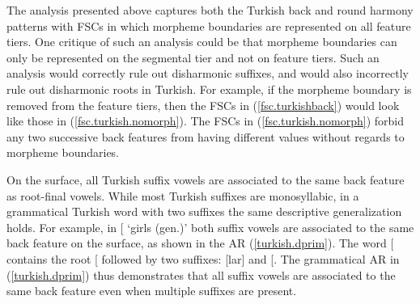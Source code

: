 \documentclass[,doc,floatsintext]{apa6}
\theoremstyle{definition}
\theoremstyle{definition}
\theoremstyle{definition}
\theoremstyle{remark}
\begin{document}
The analysis presented above captures both the Turkish back and round
harmony patterns with FSCs in which morpheme boundaries are represented
on all feature tiers. One critique of such an analysis could be that
morpheme boundaries can only be represented on the segmental tier and
not on feature tiers. Such an analysis would correctly rule out
disharmonic suffixes, and would also incorrectly rule out disharmonic
roots in Turkish. For example, if the morpheme boundary is removed from
the feature tiers, then the FSCs in (\ref{fsc.turkishback}) would look
like those in (\ref{fsc.turkish.nomorph}). The FSCs in
(\ref{fsc.turkish.nomorph}) forbid any two successive back features from
having different values without regards to morpheme boundaries.

\begin{exe}
\ex \label{fsc.turkish.nomorph}
\end{exe}

On the surface, all Turkish suffix vowels are associated to the same
back feature as root-final vowels. While most Turkish suffixes are
monosyllabic, in a grammatical Turkish word with two suffixes the same
descriptive generalization holds. For example, in
{[}\textipa{\LARGE+}\textipa{1n}{]}
`girls (gen.)' both suffix vowels are associated to the same back
feature on the surface, as shown in the AR (\ref{turkish.dprim}). The
word
{[}\textipa{\LARGE+}\textipa{1n}{]}
contains the root {[}\textipa{k1z}{]} followed by two suffixes:
{[}lar{]} and {[}\textipa{1n}{]}. The grammatical AR in
(\ref{turkish.dprim}) thus demonstrates that all suffix vowels are
associated to the same back feature even when multiple suffixes are
present.
\end{document}
